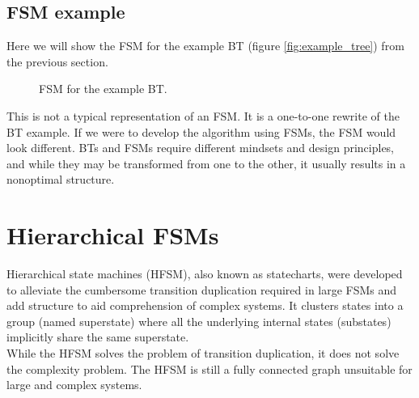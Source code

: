     \subsection{FSM example}
        Here we will show the FSM for the example BT (figure \ref{fig:example_tree}) from the previous section.
        \begin{figure}[H]
            \caption{FSM for the example BT.}
            \label{fig:example_fsm}
        \end{figure}
        This is not a typical representation of an FSM. It is a one-to-one rewrite of the BT example. If we were to develop the algorithm using FSMs, the FSM would look different. BTs and FSMs require different mindsets and design principles, and while they may be transformed from one to the other, it usually results in a nonoptimal structure.

\section{Hierarchical FSMs}
    Hierarchical state machines (HFSM), also known as statecharts, were developed to alleviate the cumbersome transition duplication required in large FSMs and add structure to aid comprehension of complex systems. It clusters states into a group (named superstate) where all the underlying internal states (substates) implicitly share the same superstate.\cite{BT_driving}\\
    While the HFSM solves the problem of transition duplication, it does not solve the complexity problem. The HFSM is still a fully connected graph unsuitable for large and complex systems.